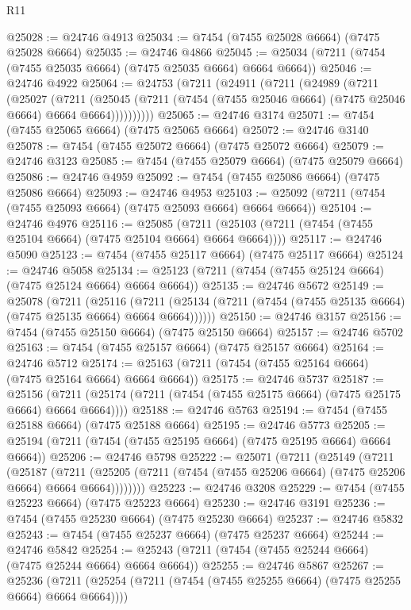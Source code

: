 \begin{lexlean}{R11}
\begin{coremodule}
@25028 := @24746 @4913
@25034 := @7454 (@7455 @25028 @6664) (@7475 @25028 @6664)
@25035 := @24746 @4866
@25045 := @25034 (@7211 (@7454 (@7455 @25035 @6664) (@7475 @25035 @6664) @6664 @6664))
@25046 := @24746 @4922
@25064 := @24753
    (@7211
      (@24911
        (@7211
          (@24989
            (@7211
              (@25027
                (@7211
                  (@25045
                    (@7211 (@7454 (@7455 @25046 @6664) (@7475 @25046 @6664) @6664 @6664))))))))))
@25065 := @24746 @3174
@25071 := @7454 (@7455 @25065 @6664) (@7475 @25065 @6664)
@25072 := @24746 @3140
@25078 := @7454 (@7455 @25072 @6664) (@7475 @25072 @6664)
@25079 := @24746 @3123
@25085 := @7454 (@7455 @25079 @6664) (@7475 @25079 @6664)
@25086 := @24746 @4959
@25092 := @7454 (@7455 @25086 @6664) (@7475 @25086 @6664)
@25093 := @24746 @4953
@25103 := @25092 (@7211 (@7454 (@7455 @25093 @6664) (@7475 @25093 @6664) @6664 @6664))
@25104 := @24746 @4976
@25116 := @25085
    (@7211 (@25103 (@7211 (@7454 (@7455 @25104 @6664) (@7475 @25104 @6664) @6664 @6664))))
@25117 := @24746 @5090
@25123 := @7454 (@7455 @25117 @6664) (@7475 @25117 @6664)
@25124 := @24746 @5058
@25134 := @25123 (@7211 (@7454 (@7455 @25124 @6664) (@7475 @25124 @6664) @6664 @6664))
@25135 := @24746 @5672
@25149 := @25078
    (@7211
      (@25116
        (@7211 (@25134 (@7211 (@7454 (@7455 @25135 @6664) (@7475 @25135 @6664) @6664 @6664))))))
@25150 := @24746 @3157
@25156 := @7454 (@7455 @25150 @6664) (@7475 @25150 @6664)
@25157 := @24746 @5702
@25163 := @7454 (@7455 @25157 @6664) (@7475 @25157 @6664)
@25164 := @24746 @5712
@25174 := @25163 (@7211 (@7454 (@7455 @25164 @6664) (@7475 @25164 @6664) @6664 @6664))
@25175 := @24746 @5737
@25187 := @25156
    (@7211 (@25174 (@7211 (@7454 (@7455 @25175 @6664) (@7475 @25175 @6664) @6664 @6664))))
@25188 := @24746 @5763
@25194 := @7454 (@7455 @25188 @6664) (@7475 @25188 @6664)
@25195 := @24746 @5773
@25205 := @25194 (@7211 (@7454 (@7455 @25195 @6664) (@7475 @25195 @6664) @6664 @6664))
@25206 := @24746 @5798
@25222 := @25071
    (@7211
      (@25149
        (@7211
          (@25187
            (@7211
              (@25205 (@7211 (@7454 (@7455 @25206 @6664) (@7475 @25206 @6664) @6664 @6664))))))))
@25223 := @24746 @3208
@25229 := @7454 (@7455 @25223 @6664) (@7475 @25223 @6664)
@25230 := @24746 @3191
@25236 := @7454 (@7455 @25230 @6664) (@7475 @25230 @6664)
@25237 := @24746 @5832
@25243 := @7454 (@7455 @25237 @6664) (@7475 @25237 @6664)
@25244 := @24746 @5842
@25254 := @25243 (@7211 (@7454 (@7455 @25244 @6664) (@7475 @25244 @6664) @6664 @6664))
@25255 := @24746 @5867
@25267 := @25236
    (@7211 (@25254 (@7211 (@7454 (@7455 @25255 @6664) (@7475 @25255 @6664) @6664 @6664))))

\end{coremodule}
\end{lexlean}
